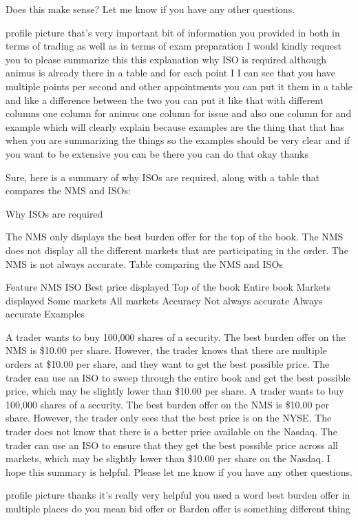 \documentclass[11pt]{article}
\begin{document}
Does this make sense? Let me know if you have any other questions.

profile picture
that's very important bit of information you provided in both in terms of trading as well as in terms of exam preparation
I would kindly request you to please summarize this
this explanation why
ISO is required although animus is already there in a table
and for each point I I can see that you have multiple points per second and other appointments you can put it them in a table
and
like a
difference between the two you can put it like that with different columns one column for animus one column for
issue and also one column for and example which will clearly explain
because examples are the thing that that has when you are summarizing the things so the examples should be very clear and if you want to be extensive you can be there you can do that okay thanks

Sure, here is a summary of why ISOs are required, along with a table that compares the NMS and ISOs:

Why ISOs are required

The NMS only displays the best burden offer for the top of the book.
The NMS does not display all the different markets that are participating in the order.
The NMS is not always accurate.
Table comparing the NMS and ISOs

Feature	NMS	ISO
Best price displayed	Top of the book	Entire book
Markets displayed	Some markets	All markets
Accuracy	Not always accurate	Always accurate
Examples

A trader wants to buy 100,000 shares of a security. The best burden offer on the NMS is \$10.00 per share. However, the trader knows that there are multiple orders at \$10.00 per share, and they want to get the best possible price. The trader can use an ISO to sweep through the entire book and get the best possible price, which may be slightly lower than \$10.00 per share.
A trader wants to buy 100,000 shares of a security. The best burden offer on the NMS is \$10.00 per share. However, the trader only sees that the best price is on the NYSE. The trader does not know that there is a better price available on the Nasdaq. The trader can use an ISO to ensure that they get the best possible price across all markets, which may be slightly lower than \$10.00 per share on the Nasdaq.
I hope this summary is helpful. Please let me know if you have any other questions.

profile picture
thanks it's really very helpful
you used a word best burden offer
in multiple places
do you mean bid offer or Barden offer is something
different thing
\end{document}
